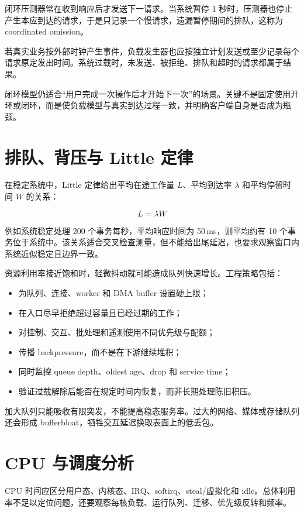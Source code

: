 闭环压测器常在收到响应后才发送下一请求。当系统暂停 1 秒时，压测器也停止产生本应到达的请求，于是只记录一个慢请求，遗漏暂停期间的排队，这称为 coordinated omission。

若真实业务按外部时钟产生事件，负载发生器也应按独立计划发送或至少记录每个请求原定发出时间。系统过载时，未发送、被拒绝、排队和超时的请求都属于结果。

闭环模型仍适合“用户完成一次操作后才开始下一次”的场景。关键不是固定使用开环或闭环，而是使负载模型与真实到达过程一致，并明确客户端自身是否成为瓶颈。

\section{排队、背压与 Little 定律}

在稳定系统中，Little 定律给出平均在途工作量 $L$、平均到达率 $\lambda$ 和平均停留时间 $W$ 的关系\cite{little-1961}：

\begin{equation}
  L=\lambda W
\end{equation}

例如系统稳定处理 200 个事务每秒，平均响应时间为 50\,ms，则平均约有 10 个事务位于系统中。该关系适合交叉检查测量，但不能给出尾延迟，也要求观察窗口内系统近似稳定且边界一致。

资源利用率接近饱和时，轻微抖动就可能造成队列快速增长。工程策略包括：

\begin{itemize}
  \item 为队列、连接、worker 和 DMA buffer 设置硬上限；
  \item 在入口尽早拒绝超过容量且已经过期的工作；
  \item 对控制、交互、批处理和遥测使用不同优先级与配额；
  \item 传播 backpressure，而不是在下游继续堆积；
  \item 同时监控 queue depth、oldest age、drop 和 service time；
  \item 验证过载解除后能否在规定时间内恢复，而非长期处理陈旧积压。
\end{itemize}

加大队列只能吸收有限突发，不能提高稳态服务率。过大的网络、媒体或存储队列还会形成 bufferbloat，牺牲交互延迟换取表面上的低丢包。

\section{CPU 与调度分析}

CPU 时间应区分用户态、内核态、IRQ、softirq、steal/虚拟化和 idle。总体利用率不足以定位问题，还要观察每核负载、运行队列、迁移、优先级反转和频率。

